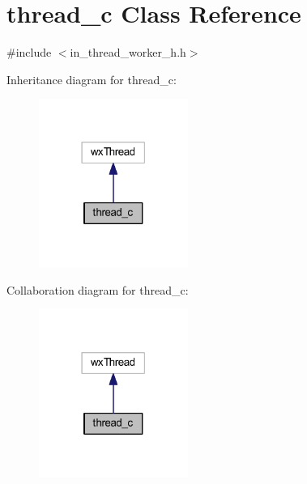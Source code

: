 \section{thread\+\_\+c Class Reference}
\label{classthread__c}


{\ttfamily \#include $<$in\+\_\+thread\+\_\+worker\+\_\+h.\+h$>$}



Inheritance diagram for thread\+\_\+c\+:\nopagebreak
\begin{figure}[H]
\begin{center}
\leavevmode
\includegraphics[width=138pt]{classthread__c__inherit__graph}
\end{center}
\end{figure}


Collaboration diagram for thread\+\_\+c\+:\nopagebreak
\begin{figure}[H]
\begin{center}
\leavevmode
\includegraphics[width=138pt]{classthread__c__coll__graph}
\end{center}
\end{figure}
